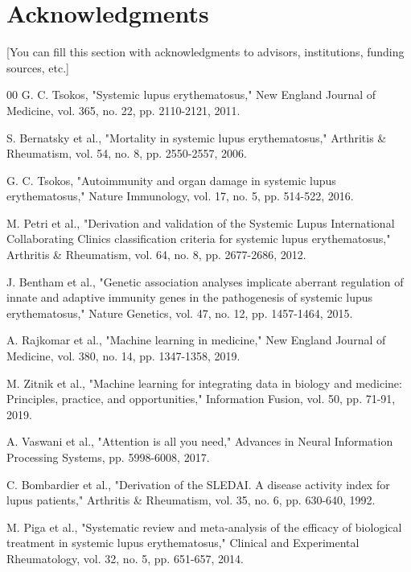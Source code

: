 \documentclass[conference]{IEEEtran}
\begin{document}
\section*{Acknowledgments}

[You can fill this section with acknowledgments to advisors, institutions, funding sources, etc.]

\begin{thebibliography}{00}
 G. C. Tsokos, "Systemic lupus erythematosus," New England Journal of Medicine, vol. 365, no. 22, pp. 2110-2121, 2011.

 S. Bernatsky et al., "Mortality in systemic lupus erythematosus," Arthritis \& Rheumatism, vol. 54, no. 8, pp. 2550-2557, 2006.

 G. C. Tsokos, "Autoimmunity and organ damage in systemic lupus erythematosus," Nature Immunology, vol. 17, no. 5, pp. 514-522, 2016.

 M. Petri et al., "Derivation and validation of the Systemic Lupus International Collaborating Clinics classification criteria for systemic lupus erythematosus," Arthritis \& Rheumatism, vol. 64, no. 8, pp. 2677-2686, 2012.

 J. Bentham et al., "Genetic association analyses implicate aberrant regulation of innate and adaptive immunity genes in the pathogenesis of systemic lupus erythematosus," Nature Genetics, vol. 47, no. 12, pp. 1457-1464, 2015.

 A. Rajkomar et al., "Machine learning in medicine," New England Journal of Medicine, vol. 380, no. 14, pp. 1347-1358, 2019.

 M. Zitnik et al., "Machine learning for integrating data in biology and medicine: Principles, practice, and opportunities," Information Fusion, vol. 50, pp. 71-91, 2019.

 A. Vaswani et al., "Attention is all you need," Advances in Neural Information Processing Systems, pp. 5998-6008, 2017.

 C. Bombardier et al., "Derivation of the SLEDAI. A disease activity index for lupus patients," Arthritis \& Rheumatism, vol. 35, no. 6, pp. 630-640, 1992.

 M. Piga et al., "Systematic review and meta-analysis of the efficacy of biological treatment in systemic lupus erythematosus," Clinical and Experimental Rheumatology, vol. 32, no. 5, pp. 651-657, 2014.


\end{thebibliography}
\end{document}
